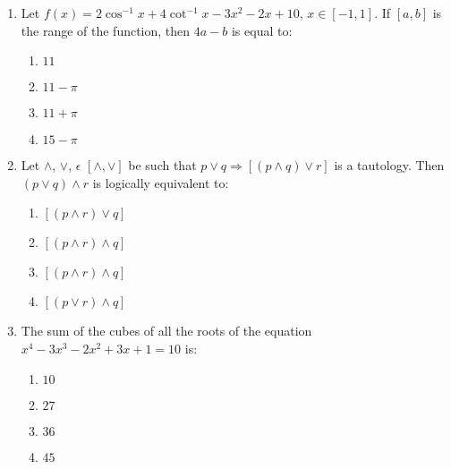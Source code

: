 \documentclass[journal]{IEEEtran}
\newcommand{\brak}[1]{\left( #1 \right)}
\newcommand{\sbrak}[1]{\left[ #1 \right]}
\begin{document}
\begin{enumerate}
        \begin{multicols}{4}
        \begin{enumerate}
        \item $60$
        \item $55$
        \item $50$
        \item $45$
        \end{enumerate}
        \end{multicols}

    \item Let $f\brak{x}=2\cos^{-1}x+4\cot^{-1}x-3x^{2}-2x+10$, $x\in\sbrak{-1,1}$. If $\sbrak{a,b}$ is the range of the function, then $4a-b$ is equal to:

        \begin{multicols}{4}
        \begin{enumerate}
        \item $11$
        \item $11-\pi$
        \item $11+\pi$
        \item $15-\pi$
        \end{enumerate}
        \end{multicols}

    \item Let $\land$, $\lor$, $\epsilon$ $\sbrak{\land,\lor}$ be such that $p\lor q\Rightarrow\sbrak{\brak{p\land q}\lor r}$ is a tautology. Then $\brak{p\lor q}\land r$ is logically equivalent to:

        \begin{multicols}{4}
        \begin{enumerate}
        \item $\sbrak{\brak{p\land r}\lor q}$
        \item $\sbrak{\brak{p\land r}\land q}$
        \item $\sbrak{\brak{p\land r}\land q}$
        \item $\sbrak{\brak{p\lor r}\land q}$
        \end{enumerate}
        \end{multicols}

    \item The sum of the cubes of all the roots of the equation $x^{4}-3x^{3}-2x^{2}+3x+1=10$ is:

        \begin{multicols}{4}
        \begin{enumerate}
        \item $10$
        \item $27$
        \item $36$
        \item $45$
        \end{enumerate}
        \end{multicols}


\end{enumerate}
\end{document}

